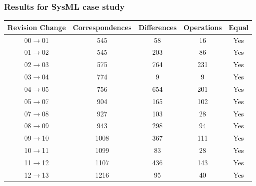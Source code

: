 \documentclass[10pt]{beamer}
\begin{document}
\begin{frame}
\frametitle{Results for SysML case study}
\begin{center}
{\small
\begin{tabular}{|c|c|c|c|c|}
\hline
Revision Change & Correspondences & Differences & Operations & Equal\\
\hline
00$\rightarrow$01 & 545 & 58 & 16  & {\color{green}Yes} \\
01$\rightarrow$02 & 545 & 203 & 86  & {\color{green}Yes} \\
02$\rightarrow$03 & 575 & 764 & 231  & {\color{green}Yes} \\
03$\rightarrow$04 & 774 & 9 & 9  & {\color{green}Yes} \\
04$\rightarrow$05 & 756 & 654 & 201  & {\color{green}Yes} \\
05$\rightarrow$07 & 904 & 165 & 102  & {\color{green}Yes} \\
07$\rightarrow$08 & 927 & 103 & 28  & {\color{green}Yes} \\
08$\rightarrow$09 & 943 & 298 & 94  & {\color{green}Yes} \\
09$\rightarrow$10 & 1008 & 367 & 111  & {\color{green}Yes} \\
10$\rightarrow$11 & 1099 & 83 & 28  & {\color{green}Yes} \\
11$\rightarrow$12 & 1107 & 436 & 143  & {\color{green}Yes} \\
12$\rightarrow$13 & 1216 & 95 & 40  & {\color{green}Yes} \\
\hline
\end{tabular}
}
\end{center}
\end{frame}
\end{document}
